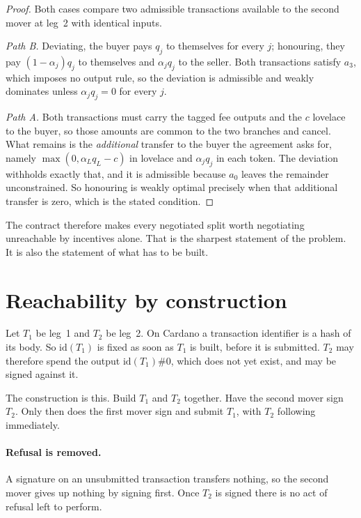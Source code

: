 \documentclass[11pt]{article}
\theoremstyle{remark}
\begin{document}
\begin{proof}
Both cases compare two admissible transactions available to the second mover at leg~2 with identical inputs.

\emph{Path B.} Deviating, the buyer pays $q_j$ to themselves for every $j$; honouring, they pay
$(1-\alpha_j)q_j$ to themselves and $\alpha_j q_j$ to the seller. Both transactions satisfy $a_3$, which imposes no
output rule, so the deviation is admissible and weakly dominates unless $\alpha_j q_j = 0$ for every $j$.

\emph{Path A.} Both transactions must carry the tagged fee outputs and the $c$ lovelace to the buyer, so those
amounts are common to the two branches and cancel. What remains is the \emph{additional} transfer to the buyer the
agreement asks for, namely $\max(0, \alpha_L q_L - c)$ in lovelace and $\alpha_j q_j$ in each token. The deviation
withholds exactly that, and it is admissible because $a_0$ leaves the remainder unconstrained. So honouring is weakly
optimal precisely when that additional transfer is zero, which is the stated condition.
\end{proof}

The contract therefore makes every negotiated split worth negotiating unreachable by incentives alone. That is the
sharpest statement of the problem. It is also the statement of what has to be built.

\section{Reachability by construction}

Let $T_1$ be leg~1 and $T_2$ be leg~2. On Cardano a transaction identifier is a hash of its body. So
$\mathrm{id}(T_1)$ is fixed as soon as $T_1$ is built, before it is submitted. $T_2$ may therefore spend the output
$\mathrm{id}(T_1)\#0$, which does not yet exist, and may be signed against it.

The construction is this. Build $T_1$ and $T_2$ together. Have the second mover sign $T_2$. Only then does the first
mover sign and submit $T_1$, with $T_2$ following immediately.

\paragraph{Refusal is removed.} A signature on an unsubmitted transaction transfers nothing, so the second mover
gives up nothing by signing first. Once $T_2$ is signed there is no act of refusal left to perform.
\end{document}
